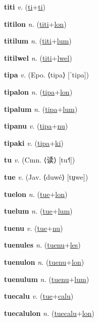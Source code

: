 \textbf{\hypertarget{titi}{titi}} \textit{v.} (\hyperlink{ti}{ti}+\allowbreak \hyperlink{ti}{ti})


\textbf{\hypertarget{titilon}{titilon}} \textit{n.} (\hyperlink{titi}{titi}+\allowbreak \hyperlink{lon}{lon})


\textbf{\hypertarget{titilum}{titilum}} \textit{n.} (\hyperlink{titi}{titi}+\allowbreak \hyperlink{lum}{lum})


\textbf{\hypertarget{titilwel}{titilwel}} \textit{n.} (\hyperlink{titi}{titi}+\allowbreak \hyperlink{lwel}{lwel})


\textbf{\hypertarget{tipa}{tipa}} \textit{v.} (Epo. ⟨tipa⟩ [ˈtipa])


\textbf{\hypertarget{tipalon}{tipalon}} \textit{n.} (\hyperlink{tipa}{tipa}+\allowbreak \hyperlink{lon}{lon})


\textbf{\hypertarget{tipalum}{tipalum}} \textit{n.} (\hyperlink{tipa}{tipa}+\allowbreak \hyperlink{lum}{lum})


\textbf{\hypertarget{tipanu}{tipanu}} \textit{v.} (\hyperlink{tipa}{tipa}+\allowbreak \hyperlink{nu}{nu})


\textbf{\hypertarget{tipaki}{tipaki}} \textit{v.} (\hyperlink{tipa}{tipa}+\allowbreak \hyperlink{ki}{ki})


\textbf{\hypertarget{tu}{tu}} \textit{v.} (Cmn. ⟨{\chinese{}读}⟩ [tu˧˥])


\textbf{\hypertarget{tue}{tue}} \textit{v.} (Jav. ⟨duwé⟩ [tṳwe])


\textbf{\hypertarget{tuelon}{tuelon}} \textit{n.} (\hyperlink{tue}{tue}+\allowbreak \hyperlink{lon}{lon})


\textbf{\hypertarget{tuelum}{tuelum}} \textit{n.} (\hyperlink{tue}{tue}+\allowbreak \hyperlink{lum}{lum})


\textbf{\hypertarget{tuenu}{tuenu}} \textit{v.} (\hyperlink{tue}{tue}+\allowbreak \hyperlink{nu}{nu})


\textbf{\hypertarget{tuenules}{tuenules}} \textit{n.} (\hyperlink{tuenu}{tuenu}+\allowbreak \hyperlink{les}{les})


\textbf{\hypertarget{tuenulon}{tuenulon}} \textit{n.} (\hyperlink{tuenu}{tuenu}+\allowbreak \hyperlink{lon}{lon})


\textbf{\hypertarget{tuenulum}{tuenulum}} \textit{n.} (\hyperlink{tuenu}{tuenu}+\allowbreak \hyperlink{lum}{lum})


\textbf{\hypertarget{tuecalu}{tuecalu}} \textit{v.} (\hyperlink{tue}{tue}+\allowbreak \hyperlink{calu}{calu})


\textbf{\hypertarget{tuecalulon}{tuecalulon}} \textit{n.} (\hyperlink{tuecalu}{tuecalu}+\allowbreak \hyperlink{lon}{lon})


